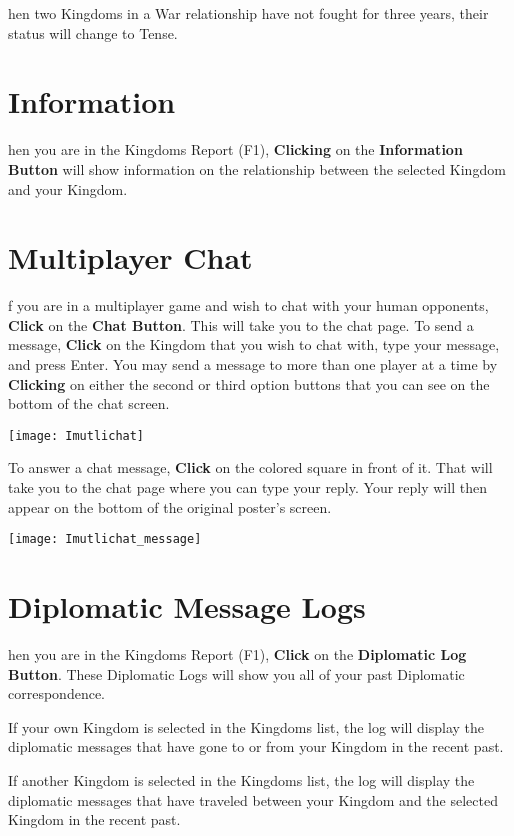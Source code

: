 
hen two Kingdoms in a War relationship have not fought for three years, their status will change to Tense.

\section{Information}


hen you are in the Kingdoms Report (F1), \textbf{Clicking} on the \textbf{Information Button} will show information on the relationship between the selected Kingdom and your Kingdom.

\section{Multiplayer Chat}




f you are in a multiplayer game and wish to chat with your human opponents, \textbf{Click} on the \textbf{Chat Button}. This will take you to the chat page. To send a message, \textbf{Click} on the Kingdom that you wish to chat with, type your message, and press Enter. You may send a message to more than one player at a time by \textbf{Clicking} on either the second or third option buttons that you can see on the bottom of the chat screen.

\begin{center}
    \texttt{[image: Imutlichat]} %
\end{center}

To answer a chat message, \textbf {Click} on the colored square in front of it. That will take you to the chat page where you can type your reply. Your reply will then appear on the bottom of the original poster’s screen.

\begin{center}
    \texttt{[image: Imutlichat\_message]} %
\end{center}

\section{Diplomatic Message Logs}



hen you are in the Kingdoms Report (F1), \textbf{Click} on the \textbf{Diplomatic Log Button}. These Diplomatic Logs will show you all of your past Diplomatic correspondence.

If your own Kingdom is selected in the Kingdoms list, the log will display the diplomatic messages that have gone to or from your Kingdom in the recent past.

If another Kingdom is selected in the Kingdoms list, the log will display the diplomatic messages that have traveled between your Kingdom and the selected Kingdom in the recent past.
